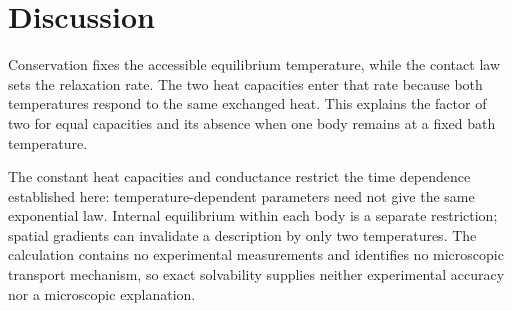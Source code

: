 \section{Discussion}
Conservation fixes the accessible equilibrium temperature, while the contact law sets the relaxation rate. The two heat capacities enter that rate because both temperatures respond to the same exchanged heat. This explains the factor of two for equal capacities and its absence when one body remains at a fixed bath temperature.

The constant heat capacities and conductance restrict the time dependence established here: temperature-dependent parameters need not give the same exponential law. Internal equilibrium within each body is a separate restriction; spatial gradients can invalidate a description by only two temperatures. The calculation contains no experimental measurements and identifies no microscopic transport mechanism, so exact solvability supplies neither experimental accuracy nor a microscopic explanation.
